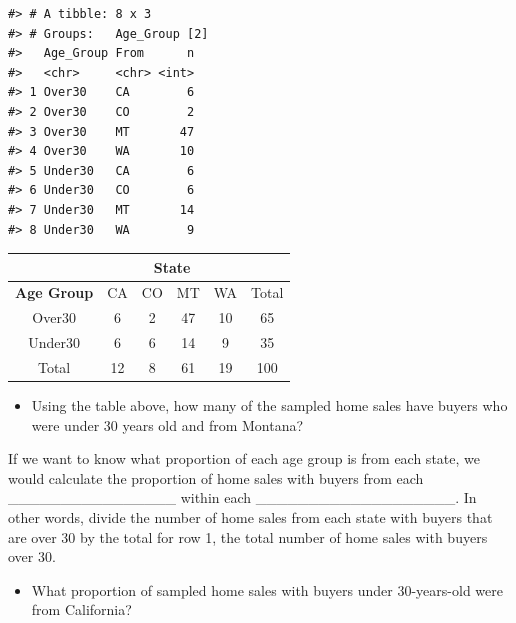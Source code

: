 \documentclass[
]{report}
\providecommand{\tightlist}{%
  \setlength{\itemsep}{0pt}\setlength{\parskip}{0pt}}
\begin{document}
\begin{verbatim}
#> # A tibble: 8 x 3
#> # Groups:   Age_Group [2]
#>   Age_Group From      n
#>   <chr>     <chr> <int>
#> 1 Over30    CA        6
#> 2 Over30    CO        2
#> 3 Over30    MT       47
#> 4 Over30    WA       10
#> 5 Under30   CA        6
#> 6 Under30   CO        6
#> 7 Under30   MT       14
#> 8 Under30   WA        9
\end{verbatim}

\begin{center}
\begingroup
\setlength{\tabcolsep}{14pt} %
\renewcommand{\arraystretch}{2} %
\begin{tabular}{|c|c|c|c|c|c|}
\hline
 & \multicolumn{4}{|c|}{\textbf{State}} & \\ \hline
\textbf{Age Group} & CA & CO & MT & WA & Total \\ \hline
 Over30 & 6 & 2 & 47 & 10 & 65 \\ \hline
 Under30 & 6 & 6 & 14 & 9 & 35 \\ \hline
 Total & 12 & 8 & 61 & 19 & 100\\ \hline  
\end{tabular}
\endgroup
\end{center}

\begin{itemize}
\tightlist
\item
  Using the table above, how many of the sampled home sales have buyers who were under 30 years old and from Montana?
\end{itemize}

\vspace{0.2in}


If we want to know what proportion of each age group is from each state, we would calculate the proportion of home sales with buyers from each \_\_\_\_\_\_\_\_\_\_\_\_\_\_\_\_ within each \_\_\_\_\_\_\_\_\_\_\_\_\_\_\_\_\_\_\_. In other words, divide the number of home sales from each state with buyers that are over 30 by the total for row 1, the total number of home sales with buyers over 30.


\begin{itemize}
\tightlist
\item
  What proportion of sampled home sales with buyers under 30-years-old were from California?
\end{itemize}

\vspace{0.3in}
\end{document}
